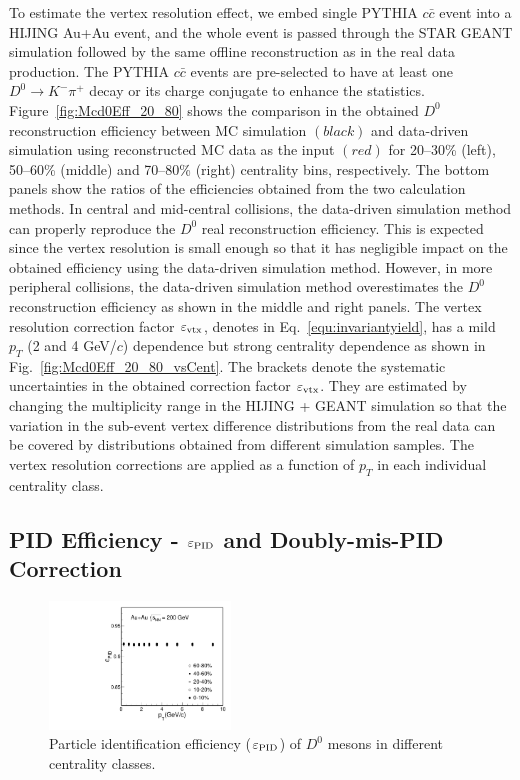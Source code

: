 \documentclass[%
 reprint,	
 amsmath,amssymb,
 aps,
 prc,
]{revtex4-1}
\begin{document}
To estimate the vertex resolution effect, we embed single PYTHIA $c\bar{c}$ event into a HIJING Au+Au event, and the whole event is passed through the STAR GEANT simulation followed by the same offline reconstruction as in the real data production. The PYTHIA $c\bar{c}$ events are pre-selected to have at least one $D^0\rightarrow K^-\pi^+$ decay or its charge conjugate to enhance the statistics. Figure~\ref{fig:Mcd0Eff_20_80} shows the comparison in the obtained $D^0$ reconstruction efficiency between MC simulation $(black)$ and data-driven simulation using reconstructed MC data as the input $(red)$ for 20--30\% (left), 50--60\% (middle) and 70--80\% (right) centrality bins, respectively. The bottom panels show the ratios of the efficiencies obtained from the two calculation methods. In central and mid-central collisions, the data-driven simulation method can properly reproduce the $D^0$ real reconstruction efficiency. This is expected since the vertex resolution is small enough so that it has negligible impact on the obtained efficiency using the data-driven simulation method. However, in more peripheral collisions, the data-driven simulation method overestimates the $D^0$ reconstruction efficiency as shown in the middle and right panels. The vertex resolution correction factor $\varepsilon_{\rm vtx}$, denotes in Eq.~\ref{equ:invariantyield}, has a mild $p_{T}$ (2 and 4 GeV/$c$) dependence but strong centrality dependence as shown in Fig.~\ref{fig:Mcd0Eff_20_80_vsCent}. The brackets denote the systematic uncertainties in the obtained correction factor $\varepsilon_{\rm vtx}$. They are estimated by changing the multiplicity range in the HIJING + GEANT simulation so that the variation in the sub-event vertex difference distributions from the real data can be covered by distributions obtained from different simulation samples. The vertex resolution corrections are applied as a function of $p_{T}$ in each individual centrality class.

\subsection{PID Efficiency - $\varepsilon_{\rm PID}$ and Doubly-mis-PID Correction}
\label{correction:PID}

\begin{figure}
\centering
\includegraphics[width=0.43\textwidth]{fig/Datad0Eff_pid_10.pdf}
\caption{Particle identification efficiency ($\varepsilon_{\rm PID}$) of $D^0$ mesons in different centrality classes.}
\label{fig:Datad0Eff_pid} 
\end{figure}
\end{document}
